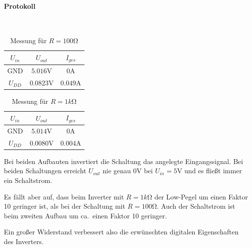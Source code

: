 \documentclass[10pt]{scrreprt}
\begin{document}
    \paragraph{Protokoll}
    $ $
    \begin{table}[H]
        \centering
        \begin{tabular}{ccc}
            \toprule
            $U_{in}$ & $U_{out}$ & $I_{ges}$\\
            \midrule
            GND & $5.016\si{\volt}$ & $0\si{\ampere}$ \\
            $U_{DD}$ & $0.0823\si{\volt}$ & $0.049\si{\ampere}$\\
            \bottomrule
        \end{tabular}
        \caption{Messung für $R = 100\si{\ohm}$}
    \end{table}

    \begin{table}[H]
        \centering
        \begin{tabular}{ccc}
            \toprule
            $U_{in}$ & $U_{out}$ & $I_{ges}$\\
            \midrule
            GND & $5.014\si{\volt}$ & $0\si{\ampere}$\\
            $U_{DD}$ & $0.0080\si{\volt}$ & $0.004\si{\ampere}$\\
            \bottomrule
        \end{tabular}
        \caption{Messung für $R=1\si{k\ohm}$}
    \end{table}

    Bei beiden Aufbauten invertiert die Schaltung das angelegte Eingangssignal.
    Bei beiden Schaltungen erreicht $U_{out}$ nie genau 0V bei $U_{in} = 5\si{\volt}$
    und es fließt immer ein Schaltstrom.

    Es fällt aber auf, dass beim Inverter mit $R = 1\si{k\ohm}$ der Low-Pegel um
    einen Faktor 10 geringer ist, als bei der Schaltung mit $R = 100\si{\ohm}$.
    Auch der Schaltstrom ist beim zweiten Aufbau um ca.~einen Faktor 10 geringer.

    Ein großer Widerstand verbessert also die erwünschten digitalen Eigenschaften
    des Inverters.
\end{document}

